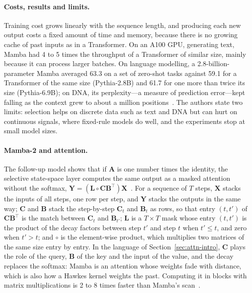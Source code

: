\paragraph{Costs, results and limits.} Training cost grows linearly with the sequence length, and producing each new
output costs a fixed amount of time and memory, because there is no growing cache of past inputs as in a Transformer.
On an A100 GPU, generating text, Mamba had 4 to 5 times the throughput of a Transformer of similar size, mainly
because it can process larger batches. On language modelling, a 2.8-billion-parameter Mamba averaged 63.3 on a set of
zero-shot tasks against 59.1 for a Transformer of the same size (Pythia-2.8B) and 61.7 for one more than twice its size (Pythia-6.9B); on DNA,
its perplexity---a measure of prediction error---kept falling as the context grew to about a million positions~\citep{gu2024mamba}. The authors state two
limits: selection helps on discrete data such as text and DNA but can hurt on continuous signals, where fixed-rule
models do well, and the experiments stop at small model sizes.

\paragraph{Mamba-2 and attention.} The follow-up model shows that if $\mathbf{A}$ is one number times the identity, the
selective state-space layer computes the same output as a masked attention without the softmax,
$\mathbf{Y} = (\mathbf{L} \circ \mathbf{C}\mathbf{B}^{\top})\mathbf{X}$~\citep{dao2024ssd}. For a sequence of $T$ steps,
$\mathbf{X}$ stacks the inputs of all steps, one row per step, and $\mathbf{Y}$ stacks the outputs in the same way;
$\mathbf{C}$ and $\mathbf{B}$ stack the step-by-step $\mathbf{C}_t$ and $\mathbf{B}_t$ as rows, so that entry $(t, t')$ of
$\mathbf{C}\mathbf{B}^{\top}$ is the match between $\mathbf{C}_t$ and $\mathbf{B}_{t'}$; $\mathbf{L}$ is a $T \times T$ mask
whose entry $(t, t')$ is the product of the decay factors between step $t'$ and step $t$ when $t' \le t$, and zero
when $t' > t$; and $\circ$ is the element-wise product, which multiplies two matrices of the same size entry by
entry.
In the language of Section~\ref{sec:attn-intro}, $\mathbf{C}$ plays the role of the query, $\mathbf{B}$ of the key and the
input of the value, and the decay replaces the softmax: Mamba is an attention whose weights fade with distance, which is
also how a Hawkes kernel weights the past. Computing it in blocks with matrix multiplications is 2 to 8 times faster than
Mamba's scan~\citep{dao2024ssd}.

